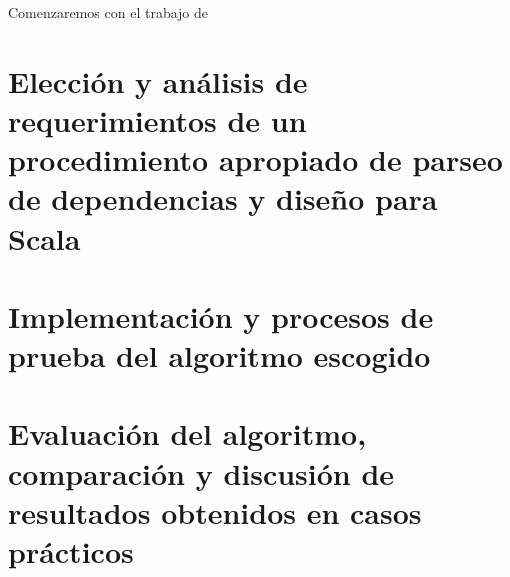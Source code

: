 Comenzaremos con el trabajo de \citeauthor{ballesteros2016}
\cite{ballesteros2016}

\section{Elección y análisis de requerimientos de un procedimiento apropiado de
  parseo de dependencias y diseño para Scala}
\label{sec:analReq}

\section{Implementación y procesos de prueba del algoritmo escogido}
\label{sec:impl}

\section{Evaluación del algoritmo, comparación y discusión de resultados
  obtenidos en casos prácticos}
\label{sec:eval}




